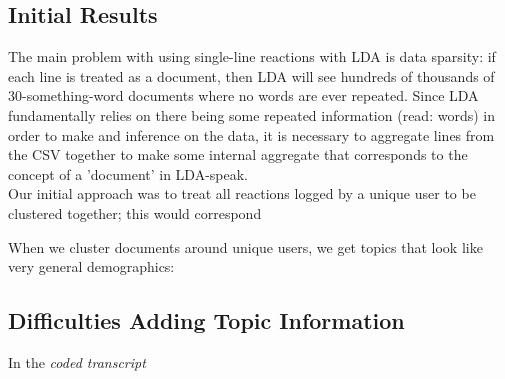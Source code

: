 \subsection{Initial Results}
The main problem with using single-line reactions with LDA is data sparsity: if each line is treated as a document, then LDA will see hundreds of thousands of 30-something-word documents where no words are ever repeated. Since LDA fundamentally relies on there being some repeated information (read: words) in order to make and inference on the data, it is necessary to aggregate lines from the CSV together to make some internal aggregate that corresponds to the concept of a 'document' in LDA-speak.\\

Our initial approach was to treat all reactions logged by a unique user to be clustered together; this would correspond

When we cluster documents around unique users, we get topics that look like very general demographics:\\



\subsection{Difficulties Adding Topic Information}


In the \emph{coded transcript}

